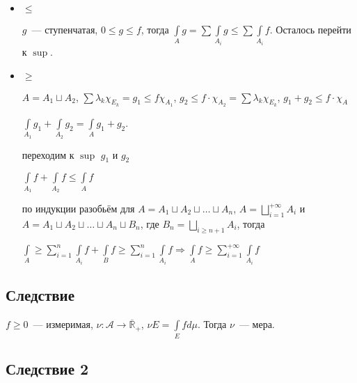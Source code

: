 \documentclass{article}
\begin{document}
                \begin{itemize}
            
                    \item $\leqslant$
                
                        $g$~--- ступенчатая, $0 \leqslant g \leqslant f$, тогда $\int\limits_A g = \sum \int\limits_{A_i} g \leqslant \sum \int\limits_{A_i} f$. Осталось перейти к $\sup$.
                    
                    \item $\geqslant$
                
                        $A = A_1 \sqcup A_2$, $\sum \lambda_k \chi_{E_k} = g_1 \leqslant f \chi_{A_1}$, $g_2 \leqslant f \cdot \chi_{A_2} = \sum \lambda_k \chi_{E_k}$, $g_1 + g_2 \leqslant f \cdot \chi_{A}$
                    
                        $\int\limits_{A_1} g_1 + \int\limits_{A_2} g_2 = \int\limits_{A} g_1 + g_2$.
                    
                        переходим к $\sup$ $g_1$ и $g_2$
                    
                        $\int\limits_{A_1} f + \int\limits_{A_2} f \leqslant \int\limits_{A} f$
                    
                        по индукции разобьём для $A = A_1 \sqcup A_2 \sqcup \ldots \sqcup A_n$, $A = \bigsqcup\limits^{+\infty}_{i = 1} A_i$ и $A = A_1 \sqcup A_2 \sqcup \ldots \sqcup A_n \sqcup B_n$, где $B_n = \bigsqcup\limits_{i \geqslant n + 1} A_i$, тогда
                    
                        $\int\limits_{A} \geqslant \sum\limits^n_{i = 1} \int\limits_{A_i} f + \int\limits_{B} f \geqslant \sum\limits^n_{i = 1} \int\limits_{A_i} f \Rightarrow \int\limits_{A}f \geqslant \sum\limits^{+\infty}_{i = 1} \int\limits_{A_i} f$
                    
                \end{itemize}
            
        \subsection{Следствие}
    
            $f \geqslant 0$~--- измеримая, $\nu : \mathcal{A} \rightarrow \overline{\mathbb{R}}_+$, $\nu E = \int\limits_{E} f d \mu$. Тогда $\nu$~--- мера.
            
        \subsection{Следствие 2}
    
\end{document}
